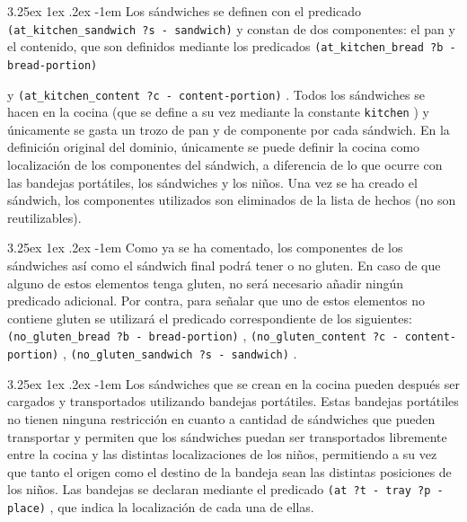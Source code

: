 \documentclass{article}
\makeatletter
\newcommand{\cool}[1] {
        {\texttt{#1}}
    }
\renewcommand\paragraph{\@startsection{paragraph}{5}{\z@}%
      {3.25ex \@plus1ex \@minus.2ex}%
      {-1em}%
      {\normalfont\normalsize\bfseries}}
\makeatother
\begin{document}
    \paragraph{}
    Los sándwiches se definen con el predicado \\ \cool{(at\_kitchen\_sandwich ?s -
    sandwich)} y constan de dos componentes: el pan y el contenido, que son
    definidos mediante los predicados \cool{(at\_kitchen\_bread ?b - bread-portion)}
    y \cool{(at\_kitchen\_content ?c - content-portion)}. Todos los sándwiches se hacen
    en la cocina (que se define a su vez mediante la constante \cool{kitchen}) y
    únicamente se gasta un trozo de pan y de componente por cada sándwich. En la
    definición original del dominio, únicamente se puede definir la cocina como
    localización de los componentes del sándwich, a diferencia de lo que ocurre con
    las bandejas portátiles, los sándwiches y los niños. Una vez se ha creado el
    sándwich, los componentes utilizados son eliminados de la lista de hechos (no
    son reutilizables).
    
    \paragraph{}
    Como ya se ha comentado, los componentes de los sándwiches así como el sándwich
    final podrá tener o no gluten. En caso de que alguno de estos elementos tenga
    gluten, no será necesario añadir ningún predicado adicional. Por contra, para
    señalar que uno de estos elementos no contiene gluten se utilizará el predicado
    correspondiente de los siguientes: \cool{(no\_gluten\_bread ?b - bread-portion)}, \cool{(no\_gluten\_content ?c - content-portion)}, \cool{(no\_gluten\_sandwich
    ?s - sandwich)}.
    
    \paragraph{}
    Los sándwiches que se crean en la cocina pueden después ser cargados y
    transportados utilizando bandejas portátiles. Estas bandejas portátiles no tienen
    ninguna restricción en cuanto a cantidad de sándwiches que pueden transportar y
    permiten que los sándwiches puedan ser transportados libremente entre la cocina
    y las distintas localizaciones de los niños, permitiendo a su vez que tanto el
    origen como el destino de la bandeja sean las distintas posiciones de los niños. Las
    bandejas se declaran mediante el predicado \cool{(at ?t - tray ?p - place)}, que
    indica la localización de cada una de ellas.
    
\end{document}
